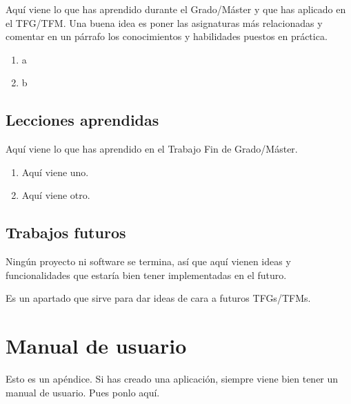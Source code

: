 \documentclass[a4paper, 12pt]{book}
\begin{document}
Aquí viene lo que has aprendido durante el Grado/Máster y que has aplicado en el TFG/TFM. Una buena idea es poner las asignaturas más relacionadas y comentar en un párrafo los conocimientos y habilidades puestos en práctica.

\begin{enumerate}
  \item a
  \item b
\end{enumerate}


\section{Lecciones aprendidas}
\label{sec:lecciones_aprendidas}

Aquí viene lo que has aprendido en el Trabajo Fin de Grado/Máster.

\begin{enumerate}
  \item Aquí viene uno.
  \item Aquí viene otro.
\end{enumerate}


\section{Trabajos futuros}
\label{sec:trabajos_futuros}

Ningún proyecto ni software se termina, así que aquí vienen ideas y funcionalidades que estaría bien tener implementadas en el futuro.

Es un apartado que sirve para dar ideas de cara a futuros TFGs/TFMs.



\cleardoublepage
\appendix
\chapter{Manual de usuario}
\label{app:manual}
Esto es un apéndice.
Si has creado una aplicación, siempre viene bien tener un manual de usuario.
Pues ponlo aquí.


\cleardoublepage


\end{document}
